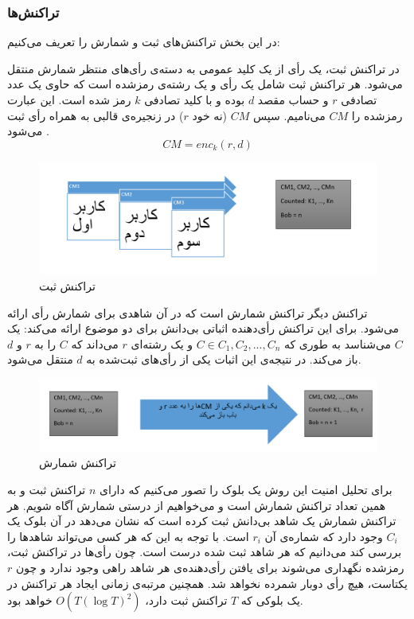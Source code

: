 \subsubsection{تراکنش‌ها}
در این بخش تراکنش‌های ثبت و شمارش را تعریف می‌کنیم:
\par
در تراکنش ثبت، یک رأی از یک کلید عمومی به دسته‌ی رأی‌های منتظر شمارش منتقل می‌شود. هر تراکنش ثبت شامل یک رأی و یک رشته‌ی 
رمزشده است که حاوی یک عدد تصادفی $r$ و حساب مقصد $d$ بوده و با کلید تصادفی $k$ رمز شده است. این عبارت رمز‌شده را $CM$ می‌نامیم. سپس $CM$ (نه خود $r$) در زنجیره‌ی قالبی به همراه رأی ثبت می‌شود
.
\\
\begin{equation}
CM = enc_{k} (r, d)
\label{eq:enc}
\end{equation}

\begin{figure}[h!]
	\centering
	\includegraphics[width=1\linewidth]{commit.PNG}
	\caption {تراکنش ثبت}
	\label{fig:commit}
\end{figure}

\par
تراکنش دیگر تراکنش شمارش است که در آن شاهدی برای شمارش رأی ارائه می‌شود. برای این تراکنش رأی‌دهنده اثباتی بی‌دانش برای دو موضوع ارائه می‌کند: یک $C$ می‌شناسد به طوری که  $C \in C_1, C_2, ... ,C_n$ و یک رشته‌ای $r$ می‌داند که $C$ را به $r$ و $d$ باز می‌کند. در نتیجه‌ی این اثبات یکی از رأی‌های ثبت‌شده به $d$ منتقل می‌شود. 

\begin{figure}[t]
	\centering
	\includegraphics[width=1\linewidth]{Count.PNG}
	\caption {تراکنش شمارش}
	\label{fig:count}
	\end{figure}
\par
برای تحلیل امنیت این روش یک بلوک را تصور می‌کنیم که دارای $n$ تراکنش ثبت و به همین تعداد تراکنش شمارش است و می‌خواهیم از درستی شمارش آگاه شویم. هر تراکنش شمارش یک شاهد بی‌دانش ثبت کرده است که نشان می‌دهد در آن بلوک یک $C_i$ وجود دارد که شماره‌ی آن $r_i$ است. با توجه به این که هر کسی می‌تواند شاهد‌ها را بررسی کند می‌دانیم که هر شاهد ثبت شده درست است. چون رأی‌‌ها در تراکنش ثبت، رمزشده نگهداری می‌شوند برای یافتن رأی‌دهنده‌ی هر شاهد راهی وجود ندارد و چون $r$ یکتاست، هیچ رأی دوبار شمرده نخواهد شد.
همچنین مرتبه‌ی زمانی ایجاد هر تراکنش در یک بلوکی که $T$ تراکنش ثبت دارد،
$O(T(\log{T})^2)$
خواهد بود.

